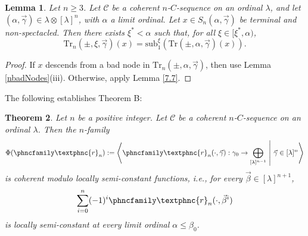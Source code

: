 \documentclass{amsart}
\newtheorem{theorem}{Theorem}
\numberwithin{theorem}{section}
\newtheorem{lemma}[theorem]{Lemma}
\theoremstyle{definition}
\newcommand{\sub}{\mathrm{sub}}
\newcommand{\ra}{\rightarrow}
\newcommand{\C}{\mathcal{C}}
\newcommand{\Tr}{\mathrm{Tr}}
\newcommand{\resh}{{\phncfamily\textphnc{r}}}
\begin{document}
\begin{lemma}\label{nEasyNodes}
Let $n\ge 3$. Let $\C$ be a coherent $n$-$C$-sequence on an ordinal $\lambda$, and let 
$(\alpha,\vec{\gamma}) \in \lambda \otimes [\lambda]^n$, with $\alpha$ a limit ordinal. Let $x\in S_n(\alpha,\vec\gamma)$ be terminal and non-spectacled. Then there exists $\xi^*<\alpha$ such that, for all $\xi\in [\xi^*,\alpha)$,
\[
\Tr_n(\pm,\xi,\vec\gamma)(x)=\sub_1^\xi(\Tr(\pm,\alpha,\vec\gamma)(x)).
\]
\end{lemma}
\begin{proof}
If $x$ descends from a bad node in $\Tr_n(\pm,\alpha,\vec\gamma)$, then use Lemma \ref{nbadNodes}(iii). Otherwise, apply Lemma \ref{7.7}.
\end{proof}

The following establishes Theorem B:

\begin{theorem}\label{mainn}
Let $n$ be a positive integer. Let $\C$ be a coherent $n$-$C$-sequence on an ordinal $\lambda$. Then the $n$-family
\[
\Phi(\resh_n):=\left\langle \resh_n(\cdot, \vec{\gamma}):\gamma_0 \ra \bigoplus_{[\lambda]^{n-1}} 
\ \middle| \ \vec{\gamma} \in [\lambda]^n \right\rangle
\]
is coherent modulo locally semi-constant functions, i.e., for every $\vec\beta\in[\lambda]^{n+1}$,
\[
\sum_{i=0}^n(-1)^i\resh_n(\cdot,\vec\beta^i)
\]
is locally semi-constant at every limit ordinal $\alpha\le\beta_0$.
\end{theorem}
\end{document}
